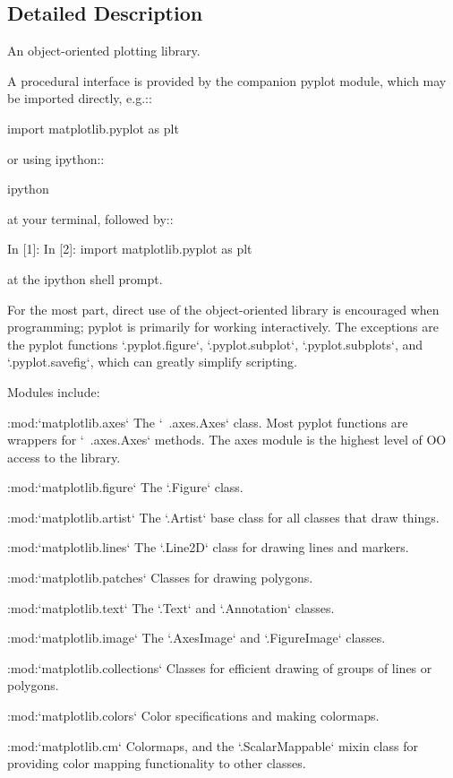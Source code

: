 \subsection{Detailed Description}
\begin{DoxyVerb}An object-oriented plotting library.

A procedural interface is provided by the companion pyplot module,
which may be imported directly, e.g.::

import matplotlib.pyplot as plt

or using ipython::

ipython

at your terminal, followed by::

In [1]: %
In [2]: import matplotlib.pyplot as plt

at the ipython shell prompt.

For the most part, direct use of the object-oriented library is encouraged when
programming; pyplot is primarily for working interactively.  The exceptions are
the pyplot functions `.pyplot.figure`, `.pyplot.subplot`, `.pyplot.subplots`,
and `.pyplot.savefig`, which can greatly simplify scripting.

Modules include:

:mod:`matplotlib.axes`
    The `~.axes.Axes` class.  Most pyplot functions are wrappers for
    `~.axes.Axes` methods.  The axes module is the highest level of OO
    access to the library.

:mod:`matplotlib.figure`
    The `.Figure` class.

:mod:`matplotlib.artist`
    The `.Artist` base class for all classes that draw things.

:mod:`matplotlib.lines`
    The `.Line2D` class for drawing lines and markers.

:mod:`matplotlib.patches`
    Classes for drawing polygons.

:mod:`matplotlib.text`
    The `.Text` and `.Annotation` classes.

:mod:`matplotlib.image`
    The `.AxesImage` and `.FigureImage` classes.

:mod:`matplotlib.collections`
    Classes for efficient drawing of groups of lines or polygons.

:mod:`matplotlib.colors`
    Color specifications and making colormaps.

:mod:`matplotlib.cm`
    Colormaps, and the `.ScalarMappable` mixin class for providing color
    mapping functionality to other classes.


\end{DoxyVerb}
